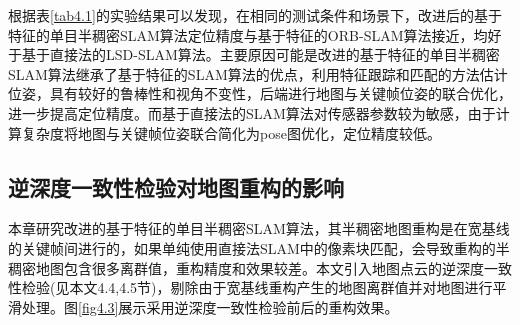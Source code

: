 根据表\ref{tab4.1}的实验结果可以发现，在相同的测试条件和场景下，改进后的基于特征的单目半稠密SLAM算法定位精度与基于特征的ORB-SLAM算法接近，均好于基于直接法的LSD-SLAM算法。主要原因可能是改进的基于特征的单目半稠密SLAM算法继承了基于特征的SLAM算法的优点，利用特征跟踪和匹配的方法估计位姿，具有较好的鲁棒性和视角不变性，后端进行地图与关键帧位姿的联合优化，进一步提高定位精度。而基于直接法的SLAM算法对传感器参数较为敏感，由于计算复杂度将地图与关键帧位姿联合简化为pose图优化，定位精度较低。

\subsection{逆深度一致性检验对地图重构的影响}
本章研究改进的基于特征的单目半稠密SLAM算法，其半稠密地图重构是在宽基线的关键帧间进行的，如果单纯使用直接法SLAM中的像素块匹配，会导致重构的半稠密地图包含很多离群值，重构精度和效果较差。本文引入地图点云的逆深度一致性检验(见本文4.4,4.5节)，剔除由于宽基线重构产生的地图离群值并对地图进行平滑处理。图\ref{fig4.3}展示采用逆深度一致性检验前后的重构效果。

